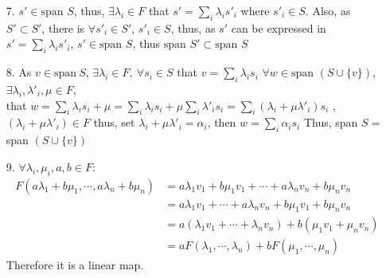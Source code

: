 \documentclass{article}
\begin{document}
\begin{itemize}
\begin{itemize}
\end{itemize}
    \item [7.] \(s' \in \text{span }S\), thus, \(\exists \lambda_i\in F\) that \(s' = \sum_i\lambda_i s'_i\) where \(s'_i\in S\). Also, as \(S'\subset S'\), there is \(\forall s'_i\in S'\), \(s'_i\in S\), thus, as \(s'\)
    can be expressed in \(s' = \sum_i\lambda_i s'_i\), \(s'\in \text{span }S\), thus \(\text{span }S'\subset\text{span }S\)
    \item [8.] As \(v\in \text{span}  \ S\), \(\exists \lambda_i\in F,\ \forall s_i \in S\) that \(v = \sum_i \lambda_is_i\)
    \(\forall w\in \text{span } (S\cup \{v\})\), \(\exists \lambda_i,\lambda'_i,\mu\in F\), \\
    that \(w=\sum_i\lambda_is_i + \mu  = \sum_i\lambda_is_i+\mu\sum_i\lambda'_is_i=\sum_i(\lambda_i+\mu\lambda'_i)s_i\)
    , \((\lambda_i+\mu\lambda'_i)\in F\) thus, set \(\lambda_i+\mu\lambda'_i=\alpha_i\), then \(w = \sum_i \alpha_is_i\) Thus, span \(S=\)span \((S\cup \{v\})\)
    
    \item [9.] \(\forall \lambda_i,\mu_i,a,b\in F\):
    \begin{align*}
        F(a\lambda_1+b\mu_1,\cdots,a\lambda_n+b\mu_n)&=a\lambda_1v_1+b\mu_1v_1+\cdots+a\lambda_nv_n+b\mu_nv_n\\
        &=a\lambda_1v_1+\cdots+a\lambda_nv_n + b\mu_1v_1+b\mu_nv_n\\
        &=a(\lambda_1v_1+\cdots+\lambda_nv_n) + b(\mu_1v_1+\mu_nv_n)\\
        &=aF(\lambda_1,\cdots,\lambda_n) + bF(\mu_1,\cdots,\mu_n)
    \end{align*}
    Therefore it is a linear map.
\end{itemize}
\end{document}
